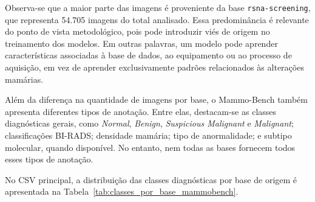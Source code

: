 \documentclass[
    12pt,
    openright,
    oneside,
    a4paper,
    english,
    brazil
]{abntex2}
\begin{document}
Observa-se que a maior parte das imagens é proveniente da base \texttt{rsna-screening}, que representa 54.705 imagens do total analisado. Essa predominância é relevante do ponto de vista metodológico, pois pode introduzir viés de origem no treinamento dos modelos. Em outras palavras, um modelo pode aprender características associadas à base de dados, ao equipamento ou ao processo de aquisição, em vez de aprender exclusivamente padrões relacionados às alterações mamárias.

Além da diferença na quantidade de imagens por base, o Mammo-Bench também apresenta diferentes tipos de anotação. Entre elas, destacam-se as classes diagnósticas gerais, como \textit{Normal}, \textit{Benign}, \textit{Suspicious Malignant} e \textit{Malignant}; classificações BI-RADS; densidade mamária; tipo de anormalidade; e subtipo molecular, quando disponível. No entanto, nem todas as bases fornecem todos esses tipos de anotação.

No CSV principal, a distribuição das classes diagnósticas por base de origem é apresentada na Tabela~\ref{tab:classes_por_base_mammobench}.


\begin{table}[H]
\centering
\caption{Distribuição das classes por base de origem no CSV principal do Mammo-Bench}
\label{tab:classes_por_base_mammobench}
\end{table}
\end{document}
